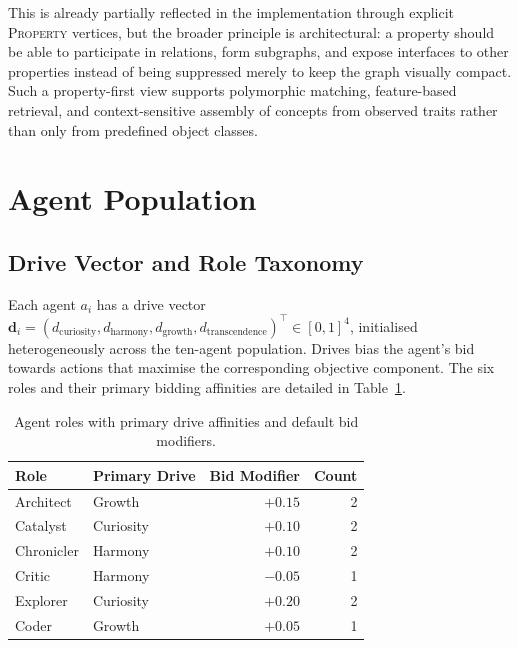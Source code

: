 \documentclass[11pt]{article}
\begin{document}
This is already partially reflected in the implementation through explicit
\textsc{Property} vertices, but the broader principle is architectural: a
property should be able to participate in relations, form subgraphs, and expose
interfaces to other properties instead of being suppressed merely to keep the
graph visually compact. Such a property-first view supports polymorphic matching,
feature-based retrieval, and context-sensitive assembly of concepts from observed
traits rather than only from predefined object classes.

\section{Agent Population}
\nopagebreak[4]
\label{sec:agents}

\subsection{Drive Vector and Role Taxonomy}

Each agent $a_i$ has a drive vector
$\mathbf{d}_i = (d_{\text{curiosity}}, d_{\text{harmony}}, d_{\text{growth}},
d_{\text{transcendence}})^\top \in [0,1]^4$, initialised heterogeneously across
the ten-agent population. Drives bias the agent's bid towards actions that
maximise the corresponding objective component. The six roles and their primary
bidding affinities are detailed in Table~\ref{tab:roles}.

\begin{table}[H]
\centering
\caption{Agent roles with primary drive affinities and default bid modifiers.}
\label{tab:roles}
\nopagebreak[4]
\small
\begin{tabular}{llrr}
\toprule
\textbf{Role} & \textbf{Primary Drive} & \textbf{Bid Modifier} & \textbf{Count} \\
\midrule
Architect   & Growth          & $+0.15$ & 2 \\
Catalyst    & Curiosity       & $+0.10$ & 2 \\
Chronicler  & Harmony         & $+0.10$ & 2 \\
Critic      & Harmony         & $-0.05$ & 1 \\
Explorer    & Curiosity       & $+0.20$ & 2 \\
Coder       & Growth          & $+0.05$ & 1 \\
\bottomrule
\end{tabular}
\end{table}
\end{document}
